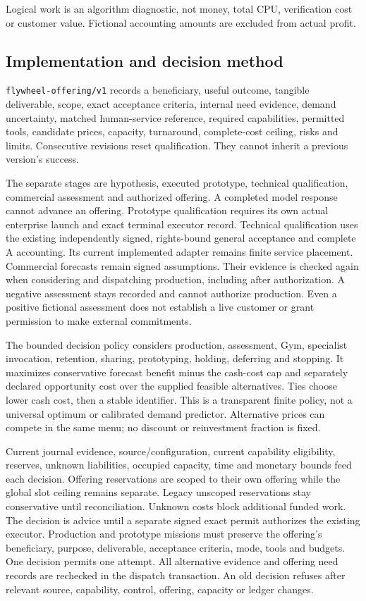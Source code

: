 \documentclass[
  10pt,
]{article}
\begin{document}
Logical work is an algorithm diagnostic, not money, total CPU,
verification cost or customer value. Fictional accounting amounts are
excluded from actual profit.

\hypertarget{implementation-and-decision-method}{%
\subsection{Implementation and decision
method}\label{implementation-and-decision-method}}

\texttt{flywheel-offering/v1} records a beneficiary, useful outcome,
tangible deliverable, scope, exact acceptance criteria, internal need
evidence, demand uncertainty, matched human-service reference, required
capabilities, permitted tools, candidate prices, capacity, turnaround,
complete-cost ceiling, risks and limits. Consecutive revisions reset
qualification. They cannot inherit a previous version's success.

The separate stages are hypothesis, executed prototype, technical
qualification, commercial assessment and authorized offering. A
completed model response cannot advance an offering. Prototype
qualification requires its own actual enterprise launch and exact
terminal executor record. Technical qualification uses the existing
independently signed, rights-bound general acceptance and complete A
accounting. Its current implemented adapter remains finite service
placement. Commercial forecasts remain signed assumptions. Their
evidence is checked again when considering and dispatching production,
including after authorization. A negative assessment stays recorded and
cannot authorize production. Even a positive fictional assessment does
not establish a live customer or grant permission to make external
commitments.

The bounded decision policy considers production, assessment, Gym,
specialist invocation, retention, sharing, prototyping, holding,
deferring and stopping. It maximizes conservative forecast benefit minus
the cash-cost cap and separately declared opportunity cost over the
supplied feasible alternatives. Ties choose lower cash cost, then a
stable identifier. This is a transparent finite policy, not a universal
optimum or calibrated demand predictor. Alternative prices can compete
in the same menu; no discount or reinvestment fraction is fixed.

Current journal evidence, source/configuration, current capability
eligibility, reserves, unknown liabilities, occupied capacity, time and
monetary bounds feed each decision. Offering reservations are scoped to
their own offering while the global slot ceiling remains separate.
Legacy unscoped reservations stay conservative until reconciliation.
Unknown costs block additional funded work. The decision is advice until
a separate signed exact permit authorizes the existing executor.
Production and prototype missions must preserve the offering's
beneficiary, purpose, deliverable, acceptance criteria, mode, tools and
budgets. One decision permits one attempt. All alternative evidence and
offering need records are rechecked in the dispatch transaction. An old
decision refuses after relevant source, capability, control, offering,
capacity or ledger changes.
\end{document}
